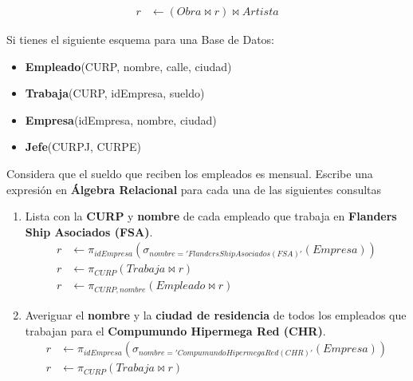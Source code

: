 \documentclass{article}
\begin{document}
\begin{enumerate}
{\begin{enumerate}
{\begin{align*}
                        r &\leftarrow (Obra \bowtie r)\bowtie Artista
                    \end{align*}
                }
            \end{enumerate}
            \item {
                Si tienes el siguiente esquema para una Base de Datos:
                \begin{itemize}[label={}]
                    \item \textbf{Empleado}(CURP, nombre, calle, ciudad)
                    \item \textbf{Trabaja}(CURP, idEmpresa, sueldo)
                    \item \textbf{Empresa}(idEmpresa, nombre, ciudad)
                    \item \textbf{Jefe}(CURPJ, CURPE)
                \end{itemize}
                Considera que el sueldo que reciben los empleados es mensual.
                Escribe una expresión en \textbf{Álgebra Relacional} para cada
                una de las siguientes consultas
                \begin{enumerate}
                    \item {
                        Lista con la \textbf{CURP} y \textbf{nombre} de cada
                        empleado que trabaja en \textbf{Flanders Ship Asociados
                        (FSA)}.
                        \begin{align*}
                            r &\leftarrow \pi_{idEmpresa}(\sigma_{nombre = 
                            'Flanders Ship Asociados(FSA)'}(Empresa)) \\
                            r &\leftarrow \pi_{CURP}(Trabaja \bowtie r) \\
                            r &\leftarrow \pi_{CURP, nombre}(Empleado \bowtie r)
                        \end{align*}
                    }
                    \item {
                        Averiguar el \textbf{nombre} y la \textbf{ciudad de
                        residencia} de todos los empleados que trabajan para el 
                        \textbf{Compumundo Hipermega Red (CHR)}.
                        \begin{align*}
                            r &\leftarrow \pi_{idEmpresa}(\sigma_{nombre = 
                            'Compumundo Hipermega Red (CHR)'}(Empresa)) \\
                            r &\leftarrow \pi_{CURP}(Trabaja \bowtie r) \\

\end{align*}}
\end{enumerate}}}
\end{enumerate}
\end{document}
